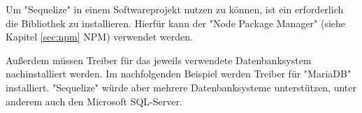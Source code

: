 
Um "Sequelize" in einem Softwareprojekt nutzen zu können, ist ein erforderlich die Bibliothek zu installieren. Hierfür kann der "Node Package Manager" (siehe Kapitel \ref{sec:npm} NPM) verwendet werden.


\cite{Sequelize}

Außerdem müssen Treiber für das jeweils verwendete Datenbanksystem nachinstalliert werden. Im nachfolgenden Beispiel werden Treiber für "MariaDB" installiert. "Sequelize" würde aber mehrere Datenbanksysteme unterstützen, unter anderem auch den Microsoft SQL-Server.


\cite{SequInstall}
